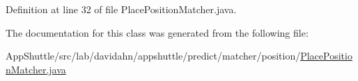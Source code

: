 \-Definition at line 32 of file \-Place\-Position\-Matcher.\-java.



\-The documentation for this class was generated from the following file\-:\begin{DoxyCompactItemize}
\item 
\-App\-Shuttle/src/lab/davidahn/appshuttle/predict/matcher/position/\hyperlink{_place_position_matcher_8java}{\-Place\-Position\-Matcher.\-java}\end{DoxyCompactItemize}
